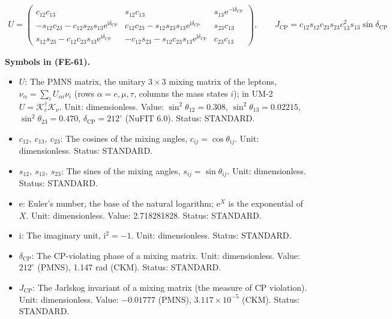 \documentclass[
  10pt,
]{article}
\providecommand{\tightlist}{%
  \setlength{\itemsep}{0pt}\setlength{\parskip}{0pt}}
\begin{document}
\[
\begin{aligned}
U = \begin{pmatrix} c_{12}c_{13} & s_{12}c_{13} & s_{13}\mathrm{e}^{-\mathrm{i}\delta_{\mathrm{CP}}}\\
 -s_{12}c_{23} - c_{12}s_{23}s_{13}\mathrm{e}^{\mathrm{i}\delta_{\mathrm{CP}}} &
 c_{12}c_{23} - s_{12}s_{23}s_{13}\mathrm{e}^{\mathrm{i}\delta_{\mathrm{CP}}} & s_{23}c_{13}\\
 s_{12}s_{23} - c_{12}c_{23}s_{13}\mathrm{e}^{\mathrm{i}\delta_{\mathrm{CP}}} &
 -c_{12}s_{23} - s_{12}c_{23}s_{13}\mathrm{e}^{\mathrm{i}\delta_{\mathrm{CP}}} &
 c_{23}c_{13}\end{pmatrix},\qquad
J_{\mathrm{CP}} = c_{12}s_{12}c_{23}s_{23}c_{13}^2s_{13}\sin\delta_{\mathrm{CP}}
\end{aligned} \tag{FE-61}
\]

\textbf{Symbols in (FE-61).}

\begin{itemize}
\tightlist
\item
  \(U\): The PMNS matrix, the unitary \(3 \times 3\) mixing matrix of
  the leptons, \(\nu_\alpha = \sum_iU_{\alpha i}\nu_i\) (rows
  \(\alpha = e, \mu, \tau\), columns the mass states \(i\)); in UM-2
  \(U = \mathcal{K}_e^\dagger\mathcal{K}_\nu\). Unit: dimensionless.
  Value: \(\sin^2\theta_{12} = 0.308\), \(\sin^2\theta_{13} = 0.02215\),
  \(\sin^2\theta_{23} = 0.470\), \(\delta_{\mathrm{CP}} = 212^\circ\)
  (NuFIT 6.0). Status: STANDARD.
\item
  \(c_{12},\ c_{13},\ c_{23}\): The cosines of the mixing angles,
  \(c_{ij} = \cos\theta_{ij}\). Unit: dimensionless. Status: STANDARD.
\item
  \(s_{12},\ s_{13},\ s_{23}\): The sines of the mixing angles,
  \(s_{ij} = \sin\theta_{ij}\). Unit: dimensionless. Status: STANDARD.
\item
  \(\mathrm{e}\): Euler's number, the base of the natural logarithm;
  \(\mathrm{e}^{X}\) is the exponential of \(X\). Unit: dimensionless.
  Value: 2.718281828. Status: STANDARD.
\item
  \(\mathrm{i}\): The imaginary unit, \(\mathrm{i}^2 = -1\). Unit:
  dimensionless. Status: STANDARD.
\item
  \(\delta_{\mathrm{CP}}\): The CP-violating phase of a mixing matrix.
  Unit: dimensionless. Value: \(212^\circ\) (PMNS), 1.147 rad (CKM).
  Status: STANDARD.
\item
  \(J_{\mathrm{CP}}\): The Jarlskog invariant of a mixing matrix (the
  measure of CP violation). Unit: dimensionless. Value: \(-0.01777\)
  (PMNS), \(3.117\times10^{-5}\) (CKM). Status: STANDARD.
\end{itemize}
\end{document}
